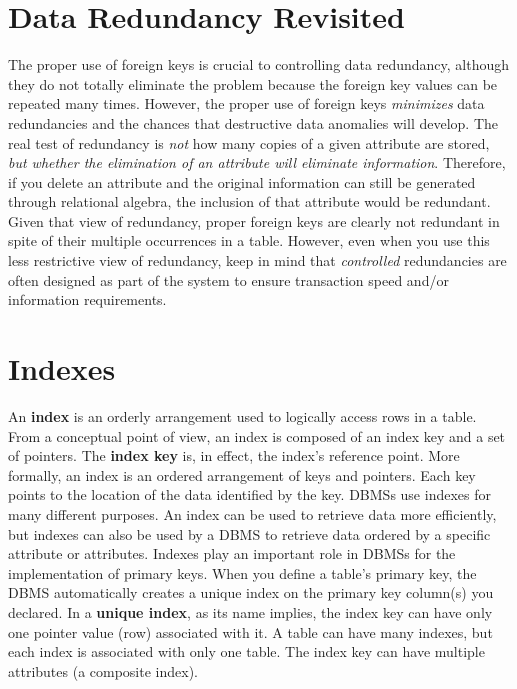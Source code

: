 \documentclass[a4paper, 12pt, titlepage]{report}
\begin{document}
{\section{Data Redundancy Revisited}
The proper use of foreign keys is crucial to controlling data redundancy, although they do not totally eliminate the problem because the foreign key values can be repeated many times. However, the proper use of foreign keys \emph{minimizes} data redundancies and the chances that destructive data anomalies will develop. The real test of redundancy is \emph{not} how many copies of a given attribute are stored, \emph{but whether the elimination of an attribute will eliminate information}. Therefore, if you delete an attribute and the original information can still be generated through relational algebra, the inclusion of that attribute would be redundant. Given that view of redundancy, proper foreign keys are clearly not redundant in spite of their multiple occurrences in a table. However, even when you use this less restrictive view of redundancy, keep in mind that \emph{controlled} redundancies are often designed as part of the system to ensure transaction speed and/or information requirements.
\section{Indexes}
An \textbf{index} is an orderly arrangement used to logically access rows in a table. From a conceptual point of view, an index is composed of an index key and a set of pointers. The \textbf{index key} is, in effect, the index’s reference point. More formally, an index is an ordered arrangement of keys and pointers. Each key points to the location of the data identified by the key. DBMSs use indexes for many different purposes. An index can be used to retrieve data more efficiently, but indexes can also be used by a DBMS to retrieve data ordered by a specific attribute or attributes. Indexes play an important role in DBMSs for the implementation of primary keys. When you define a table’s primary key, the DBMS automatically creates a unique index on the primary key column(s) you declared. In a \textbf{unique index}, as its name implies, the index key can have only one pointer value (row) associated with it. A table can have many indexes, but each index is associated with only one table. The index key can have multiple attributes (a composite index).\pagebreak
}
\end{document}
